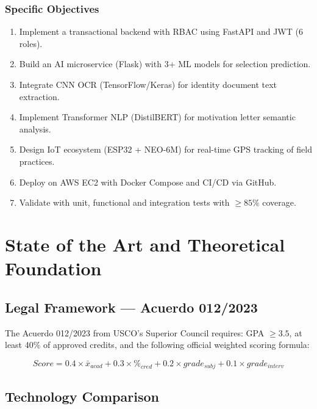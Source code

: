 \documentclass[12pt,a4paper,twoside]{report}
\begin{document}
\subsection{Specific Objectives}
\begin{enumerate}[label=\textbf{SO\arabic*.},leftmargin=*]
\item Implement a transactional backend with RBAC using FastAPI and JWT (6 roles).
\item Build an AI microservice (Flask) with 3+ ML models for selection prediction.
\item Integrate CNN OCR (TensorFlow/Keras) for identity document text extraction.
\item Implement Transformer NLP (DistilBERT) for motivation letter semantic analysis.
\item Design IoT ecosystem (ESP32 + NEO-6M) for real-time GPS tracking of field practices.
\item Deploy on AWS EC2 with Docker Compose and CI/CD via GitHub.
\item Validate with unit, functional and integration tests with $\geq 85\%$ coverage.
\end{enumerate}

\chapter{State of the Art and Theoretical Foundation}

\section{Legal Framework — Acuerdo 012/2023}

The Acuerdo 012/2023 from USCO's Superior Council requires: GPA $\geq 3.5$, at least 40\% of
approved credits, and the following official weighted scoring formula:

\begin{equation}
Score = 0.4 \times \bar{x}_{acad} + 0.3 \times \%_{cred} + 0.2 \times grade_{subj} + 0.1 \times grade_{interv}
\end{equation}

\section{Technology Comparison}
\end{document}
